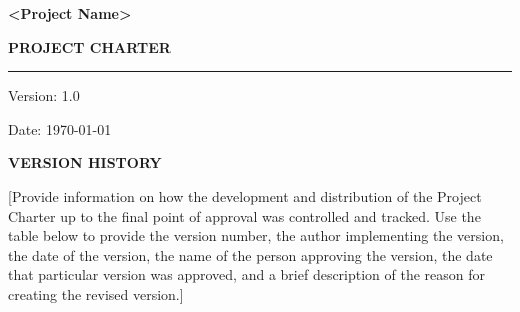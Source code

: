 \documentclass[a4paper, 11pt]{article}
\begin{document}
\noindent

\vspace*{240pt}
\hfill\textbf{\Large \textless{}Project Name\textgreater{}}

\hfill\textbf{\Large PROJECT CHARTER}

\vspace{5pt}
\hrule

\hfill Version: 1.0

\hfill Date: \today
  
\newpage


\textbf{VERSION HISTORY}

{[}Provide information on how the development and distribution of the
Project Charter up to the final point of approval was controlled and
tracked. Use the table below to provide the version number, the author
implementing the version, the date of the version, the name of the
person approving the version, the date that particular version was
approved, and a brief description of the reason for creating the revised
version.{]}
\end{document}
